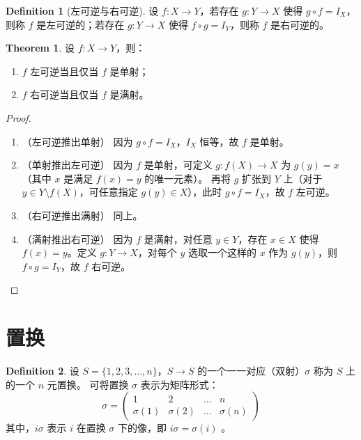 \documentclass[oneside]{book}
\theoremstyle{definition}
\newtheorem{definition}{Definition}[section]
\newtheorem{theorem}{Theorem}[section]
\begin{document}
	\begin{definition}[左可逆与右可逆]
		设 \( f: X \to Y \)，若存在 \( g: Y \to X \) 使得 \( g \circ f = I_X \)，则称 \( f \) 是左可逆的；若存在 \( g: Y \to X \) 使得 \( f \circ g = I_Y \)，则称 \( f \) 是右可逆的。
	\end{definition}
	
	\begin{theorem}
		设 \( f: X \to Y \)，则： 
		\begin{enumerate}
			\item \( f \) 左可逆当且仅当 \( f \) 是单射；
			\item \( f \) 右可逆当且仅当 \( f \) 是满射。
		\end{enumerate}
	\end{theorem}
	
	\begin{proof}
		\begin{enumerate}
			\item [\( \Rightarrow \)] （左可逆推出单射）
			因为 \( g \circ f = I_X \)，\(I_X\) 恒等，故 \(f\) 是单射。
			\item [\( \Leftarrow \)] （单射推出左可逆）
			因为 \( f \) 是单射，可定义 \( g: f(X) \to X \) 为 \( g(y) = x \)（其中 \( x \) 是满足 \( f(x) = y \) 的唯一元素）。
			再将 \( g \) 扩张到 \( Y \) 上（对于 \( y \in Y \setminus f(X) \)，可任意指定 \( g(y) \in X \)），此时 \( g \circ f = I_X \)，故 \( f \) 左可逆。
			\item [\( \Rightarrow \)] （右可逆推出满射）
			同上。
			\item [\( \Leftarrow \)] （满射推出右可逆）
			因为 \( f \) 是满射，对任意 \( y \in Y \)，存在 \( x \in X \) 使得 \( f(x) = y \)。定义 \( g: Y \to X \)，对每个 \( y \) 选取一个这样的 \( x \) 作为 \( g(y) \)，则 \( f \circ g = I_Y \)，故 \( f \) 右可逆。
		\end{enumerate}
	\end{proof}
	
	\section{置换}
	
	\begin{definition}
		设 \( S = \{1, 2, 3, \dots, n\} \)，\( S \to S \) 的一个一一对应（双射）\( \sigma \) 称为 \( S \) 上的一个 \( n \) 元置换。  
		可将置换 \( \sigma \) 表示为矩阵形式：  
		\[
		\sigma = \begin{pmatrix} 
			1 & 2 & \dots & n \\
			\sigma(1) & \sigma(2) & \dots & \sigma(n) 
		\end{pmatrix}
		\]  
		其中，\( i\sigma \) 表示 \( i \) 在置换 \( \sigma \) 下的像，即 \( i\sigma = \sigma(i) \)  。
	\end{definition}
	
\end{document}
